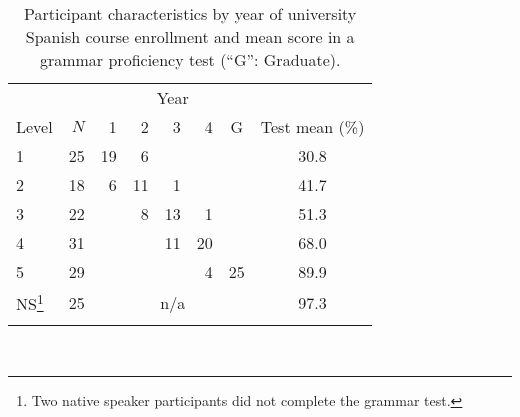 \documentclass[output=paper]{langscibook}
\begin{document}
\begin{table}
\begin{tabular}{lr *4{r} c c }
\lsptoprule
      &     & \multicolumn{5}{c}{Year} & \\\cmidrule(lr){3-7}
Level & $N$ & 1  & 2 & 3 & 4 & G  & Test mean (\%)\\\midrule
    1 &  25 & 19 & 6 &   &   &      &  30.8\\
    2 &  18 & 6  & 11& 1 &   &      &  41.7\\
    3 &  22 &    & 8 & 13 & 1&      &  51.3\\
    4 &  31 &    &   & 11 & 20 &    &  68.0\\
    5 &  29 &    &   &    & 4  & 25 &  89.9\\
NS\footnote{Two native speaker participants did not complete the grammar test.} & 25 & \multicolumn{5}{c}{n/a} & 97.3\\
\lspbottomrule
\end{tabular}\\
\caption{Participant characteristics by year of university Spanish course enrollment and mean score in a grammar proficiency test (“G”: Graduate).}
\label{tab:geeslin:1}
\end{table}



\end{document}
